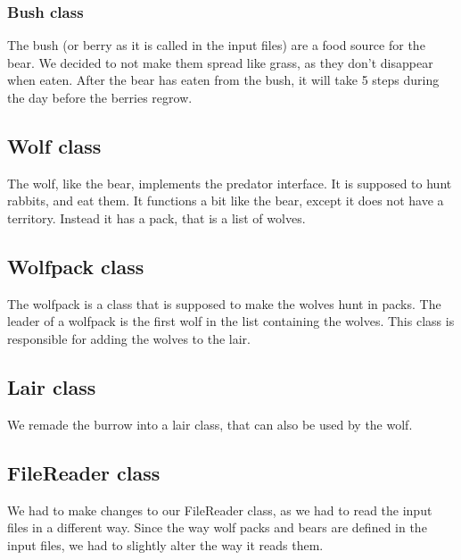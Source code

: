 \documentclass[11pt]{article}
\begin{document}
    \subsubsection*{Bush class}
    The bush (or berry as it is called in the input files) are a food source for the bear. We decided to not make them spread like grass, as they don't 
    disappear when eaten. After the bear has eaten from the bush, it will take 5 steps during the day before the berries regrow.
    \subsection*{Wolf class}
    The wolf, like the bear, implements the predator interface. It is supposed to hunt rabbits, and eat them. It functions a bit like the bear, except 
    it does not have a territory. Instead it has a pack, that is a list of wolves.
    \subsection*{Wolfpack class}
    The wolfpack is a class that is supposed to make the wolves hunt in packs. The leader of a wolfpack is the first wolf in the list 
    containing the wolves. This class is responsible for adding the wolves to the lair. 
    \subsection*{Lair class}
    We remade the burrow into a lair class, that can also be used by the wolf. 
    \subsection*{FileReader class}
    We had to make changes to our FileReader class, as we had to read the input files in a different way. Since the way wolf packs 
    and bears are defined in the input files, we had to slightly alter the way it reads them. 
\end{document}
